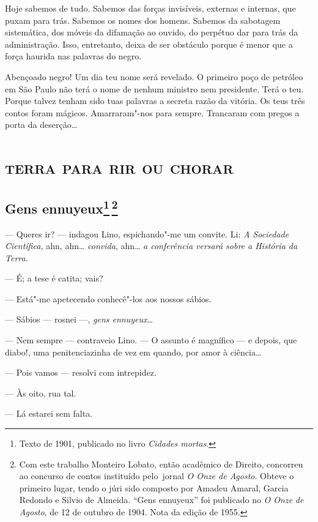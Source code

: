 Hoje sabemos de tudo. Sabemos das forças invisíveis, externas e
internas, que puxam para trás. Sabemos os nomes dos homens. Sabemos da
sabotagem sistemática, dos móveis da difamação ao ouvido, do perpétuo
dar para trás da administração. Isso, entretanto, deixa de ser obstáculo
porque é menor que a força haurida nas palavras do negro.

Abençoado negro! Um dia teu nome será revelado. O primeiro poço de
petróleo em São Paulo não terá o nome de nenhum ministro nem presidente.
Terá o teu. Porque talvez tenham sido tuas palavras a secreta razão da
vitória. Os teus três contos foram mágicos. Amarraram"-nos para sempre.
Trancaram com pregos a porta da deserção\ldots{}

\part{\textsc{terra para rir ou chorar}}

\chapter{Gens ennuyeux\footnote[*]{Texto de 1901, publicado no livro \emph{Cidades mortas}.}\,\footnote[**]{Com este trabalho Monteiro
  Lobato, então acadêmico de Direito, concorreu ao concurso de contos
  instituído pelo~jornal \emph{O Onze de Agosto}. Obteve o primeiro
  lugar, tendo o júri sido composto por Amadeu Amaral, Garcia Redondo e
  Silvio de Almeida. ``Gens ennuyeux'' foi publicado no \emph{O Onze}
  \emph{de Agosto}, de 12 de outubro de 1904. Nota da edição de 1955.}}

--- Queres ir? --- indagou Lino, espichando"-me um convite. Li: \emph{A
Sociedade Científica,} ahn, ahn\ldots{} \emph{convida}, ahn\ldots{} \emph{a
conferência versará sobre a História da Terra}.

--- É; a tese é catita; vais?

--- Está"-me apetecendo conhecê"-los aos nossos sábios.

--- Sábios --- rosnei ---, \emph{gens ennuyeux}\ldots{}

--- Nem sempre --- contraveio Lino. --- O assunto é magnífico --- e
depois, que diabo!, uma penitenciazinha de vez em quando, por amor à
ciência\ldots{}

--- Pois vamos --- resolvi com intrepidez.

--- Às oito, rua tal.

--- Lá estarei sem falta.

\asterisc

